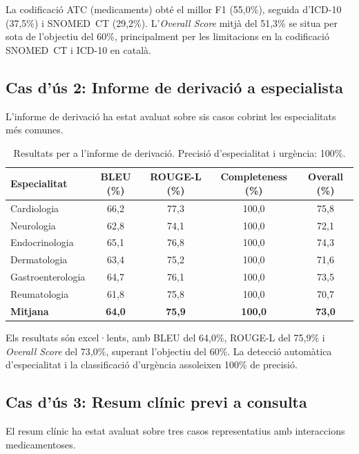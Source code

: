 \documentclass[CAT]{TFUOC}%
\begin{document}
La codificació ATC (medicaments) obté el millor F1 (55,0\%), seguida d'ICD-10 (37,5\%) i SNOMED~CT (29,2\%). L'\textit{Overall Score} mitjà del 51,3\% se situa per sota de l'objectiu del 60\%, principalment per les limitacions en la codificació SNOMED~CT i ICD-10 en català.

\subsection{Cas d'ús 2: Informe de derivació a especialista}

L'informe de derivació ha estat avaluat sobre sis casos cobrint les especialitats més comunes.

\begin{table}[H]
\centering
\small
\begin{tabular}{lcccc}
\hline
\textbf{Especialitat} & \textbf{BLEU (\%)} & \textbf{ROUGE-L (\%)} & \textbf{Completeness (\%)} & \textbf{Overall (\%)} \\
\hline
Cardiologia & 66,2 & 77,3 & 100,0 & 75,8 \\
Neurologia & 62,8 & 74,1 & 100,0 & 72,1 \\
Endocrinologia & 65,1 & 76,8 & 100,0 & 74,3 \\
Dermatologia & 63,4 & 75,2 & 100,0 & 71,6 \\
Gastroenterologia & 64,7 & 76,1 & 100,0 & 73,5 \\
Reumatologia & 61,8 & 75,8 & 100,0 & 70,7 \\
\hline
\textbf{Mitjana} & \textbf{64,0} & \textbf{75,9} & \textbf{100,0} & \textbf{73,0} \\
\hline
\end{tabular}
\caption{Resultats per a l'informe de derivació. Precisió d'especialitat i urgència: 100\%.}
\label{tab:referral-results}
\end{table}

Els resultats són excel·lents, amb BLEU del 64,0\%, ROUGE-L del 75,9\% i \textit{Overall Score} del 73,0\%, superant l'objectiu del 60\%. La detecció automàtica d'especialitat i la classificació d'urgència assoleixen 100\% de precisió.

\subsection{Cas d'ús 3: Resum clínic previ a consulta}

El resum clínic ha estat avaluat sobre tres casos representatius amb interaccions medicamentoses.
\end{document}
